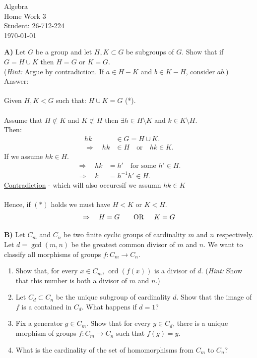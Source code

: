 \documentclass[12pt,a4paper]{article}
\begin{document}
\begin{titlepage}
\centering
\vspace*{\fill}
{\Huge Algebra} \\[0.5cm]
{\Huge Home Work 3}\\[1.5cm]
{\Large Student: 26-712-224}\\[0.5cm]
{\Large \today}
\vspace*{\fill}
\end{titlepage}

\newpage
\noindent\textbf{A)} Let $G$ be a group and let $H,K\subset G$ be subgroups of $G$. Show that if $G=H\cup K$ then $H=G$ or $K=G$.\\
(\textit{Hint:} Argue by contradiction. If $a\in H-K$ and $b\in K-H$, consider $ab$.)\\

\vspace{1cm}
\noindent
Answer:\\
\\
Given $H,K<G$ such that: $H\cup K=G$ (*).\\
\\
Assume that $H \not\subset K$ and $K \not\subset H$ then $\exists h\in H\setminus K$ and $k\in K\setminus H$.\\
Then:
\begin{align*}
hk&\in G=H\cup K.\\
\Rightarrow\quad hk&\in H\quad\text{or}\quad hk\in K.
\end{align*}
If we assume $hk\in H$.
\begin{align*}
\Rightarrow\quad hk&=h'\quad\text{for some }h'\in H.\\
\Rightarrow\quad k&=h^{-1}h'\in H.
\end{align*}
\underline{Contradiction} - which will also occuresif we assumn $hk \in K$\\
\\
Hence, if $(*)$ holds we must have $H < K$ or $K < H$.
\begin{align*}
\Rightarrow\quad H=G \quad\quad \text{OR \;\;\;\;$K=G$}
\end{align*}

\newpage

\noindent\textbf{B)} Let $C_m$ and $C_n$ be two finite cyclic groups of cardinality $m$ and $n$ respectively. Let $d=\gcd(m,n)$ be the greatest common divisor of $m$ and $n$. We want to classify all morphisms of groups $f:C_m\to C_n$.

\begin{enumerate}
\item[(1)] Show that, for every $x\in C_m$, $\operatorname{ord}(f(x))$ is a divisor of $d$. (\textit{Hint:} Show that this number is both a divisor of $m$ and $n$.)
\item[(2)] Let $C_d\subset C_n$ be the unique subgroup of cardinality $d$. Show that the image of $f$ is a contained in $C_d$. What happens if $d=1$?
\item[(3)] Fix a generator $g\in C_m$. Show that for every $y\in C_d$, there is a unique morphism of groups $f:C_m\to C_n$ such that $f(g)=y$.
\item[(4)] What is the cardinality of the set of homomorphisms from $C_m$ to $C_n$?
\end{enumerate}
\end{document}
